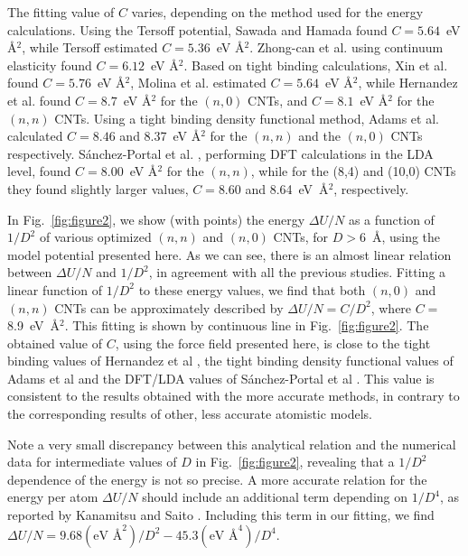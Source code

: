 \documentclass[aps,prb,floatfix,twocolumn,showpacs]{revtex4}
\begin{document}
The fitting value of $C$ varies, depending on the method used for the energy calculations.
Using the Tersoff \cite{Tersoff} potential,  Sawada and Hamada \cite{Sawada} found $C=5.64$~eV \AA$^2$,
while Tersoff\cite{Tersoff_CNTs} estimated $C=5.36$~eV \AA$^2$.
Zhong-can et al. \cite{Zhong-can} using continuum elasticity found $C=6.12$~eV \AA$^2$. 
Based on tight binding calculations, Xin et al. \cite{Xin} found $C=5.76$~eV \AA$^2$,
Molina et al. \cite{Molina} estimated $C=5.64$~eV \AA$^2$, while Hernandez et al. \cite{Rubio} 
found $C=8.7$~eV \AA$^2$ for the $(n,0)$ CNTs, and $C=8.1$~eV \AA$^2$ for the $(n,n)$ CNTs.
Using a tight binding density functional method, Adams et al. \cite{Adams} calculated
$C=8.46$ and 8.37~eV \AA$^2$ for the $(n,n)$ and the $(n,0)$ CNTs respectively.
S\'anchez-Portal et al. \cite{Portal}, performing DFT calculations in the LDA level\cite{siesta1,siesta2},
found $C=8.00$~eV \AA$^2$ for the $(n,n)$, while for the (8,4) and (10,0) CNTs they found
slightly larger values, $C=8.60$ and 8.64~eV~\AA$^2$, respectively. 

In Fig.~\ref{fig:figure2}, we show (with points) the energy $\Delta U/N$
as a function of $1/D^2$ of various optimized $(n,n)$ and $(n,0)$ CNTs,
for $D>6$~\AA, using the model potential presented here. 
As we can see, there is an almost linear relation between $\Delta U/N$
and $1/D^2$, in agreement with all the previous studies.
Fitting a linear function of $1/D^2$ to these energy values, we find that both $(n,0)$ and $(n,n)$ CNTs
can be approximately described by $\Delta U/N=C/D^2$, where $C=$8.9~eV~\AA$^2$.
This fitting is shown by continuous line in Fig.~\ref{fig:figure2}.
The obtained value of $C$, using the force field presented here, is close to the 
tight binding values of Hernandez et al \cite{Rubio}, the tight binding
density functional values of Adams et al \cite{Adams} and the DFT/LDA values of 
S\'anchez-Portal et al \cite{Portal}. This value is consistent to the
results obtained with the more accurate methods, in contrary to the corresponding results of other,
less accurate atomistic models.

Note a very small discrepancy between this analytical relation and the numerical data for intermediate values
of $D$ in Fig.~\ref{fig:figure2}, revealing that a $1/D^2$ dependence of the energy is not so precise. 
A more accurate relation for the energy per atom $\Delta U/N$ should include an additional
term depending on $1/D^4$, as reported by Kanamitsu and Saito \cite{Kanamitsu}.
Including this term in our fitting, we find
$\Delta U/N =9.68 (\mbox{eV \AA}^2) / D^2 - 45.3(\mbox{eV \AA}^4) / D^4 $.
\end{document}
